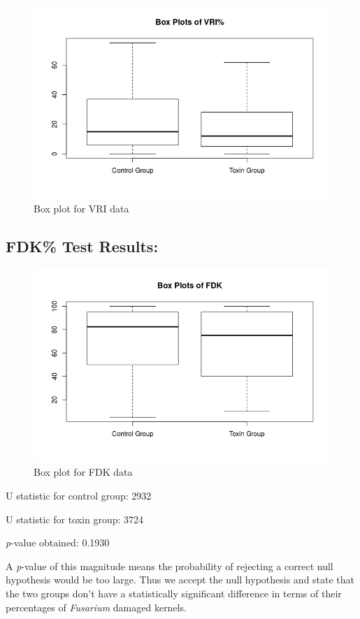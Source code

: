\documentclass[11pt]{article}
\begin{document}
\begin{figure}[h]
\centering
\includegraphics[width=\textwidth]{VRI}
\caption{Box plot for VRI data}
\end{figure}

\subsection{FDK\% Test Results:}
\label{sec:org328a8c3}
\begin{figure}[h]
\centering
\includegraphics[width=\textwidth]{FDK}
\caption{Box plot for FDK data}
\end{figure}

\noindent
U statistic for control group: 2932

\noindent
U statistic for toxin group: 3724

\noindent
\textit{p}-value obtained: 0.1930

A \textit{p}-value of this magnitude means the probability of rejecting a correct null hypothesis would be too large. Thus we accept the null hypothesis and state that the two groups don't have a statistically significant difference in terms of their percentages of \emph{Fusarium} damaged kernels.
\end{document}
